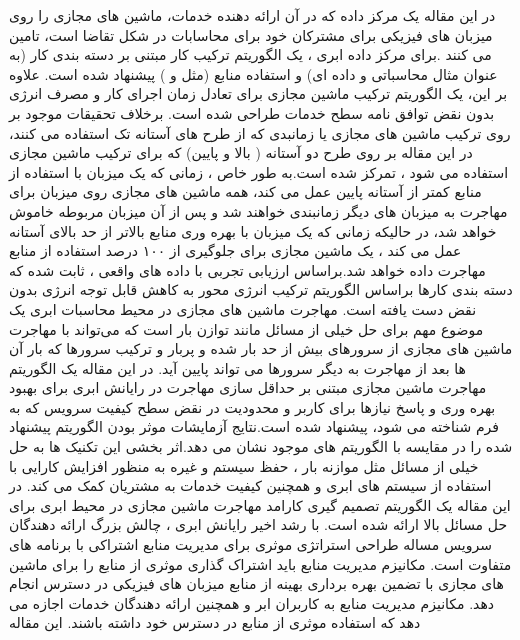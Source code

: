 در این مقاله
\cite{num8}
یک مرکز داده که در آن ارائه دهنده خدمات، ماشین های مجازی را روی میزبان های فیزیکی برای مشترکان خود برای محاسابات در شکل تقاضا است، تامین می کنند .برای مرکز داده ابری ، یک الگوریتم ترکیب کار مبتنی بر دسته بندی کار (به عنوان مثال محاسباتی و داده ای) و استفاده منابع (مثل 
  و
   ) پیشنهاد شده است. علاوه بر این، یک الگوریتم ترکیب ماشین مجازی برای تعادل زمان اجرای کار و مصرف انرژی بدون نقض توافق نامه سطح خدمات
     طراحی شده است. برخلاف تحقیقات موجود بر روی ترکیب ماشین های مجازی یا زمانبدی که از طرح های آستانه تک استفاده می کنند، در این مقاله بر روی  طرح دو آستانه ( بالا و پایین) که برای ترکیب ماشین مجازی استفاده می شود ، تمرکز شده است.به طور خاص ، زمانی که یک میزبان با استفاده از منابع کمتر از آستانه پایین عمل می کند، همه ماشین های مجازی روی میزبان برای مهاجرت به میزبان های دیگر زمانبندی خواهند شد و پس از آن میزبان مربوطه خاموش خواهد شد، در حالیکه زمانی که یک میزبان با بهره وری منابع بالاتر از حد بالای آستانه عمل می کند ، یک ماشین مجازی برای جلوگیری از  ۱۰۰ درصد استفاده از منابع مهاجرت داده خواهد شد.براساس ارزیابی تجربی با داده های واقعی ، ثابت شده که دسته بندی کارها براساس الگوریتم ترکیب انرژی محور به کاهش قابل توجه انرژی بدون نقض 
       دست یافته است.
  مهاجرت ماشین های مجازی در محیط محاسبات ابری یک موضوع مهم برای حل خیلی از مسائل مانند توازن بار است که می‌تواند با  مهاجرت ماشین های مجازی از سرورهای بیش از حد بار شده و پربار و ترکیب سرورها که بار آن ها بعد از مهاجرت به دیگر سرورها می تواند پایین آید. در این مقاله
\cite{num9}
  یک الگوریتم مهاجرت ماشین مجازی مبتنی بر حداقل سازی مهاجرت در رایانش ابری برای بهبود بهره وری و پاسخ نیازها برای کاربر و محدودیت در نقض سطح کیفیت سرویس که به فرم 
    شناخته می شود، پیشنهاد شده است.نتایج آزمایشات موثر بودن الگوریتم پیشنهاد شده 
    را در مقایسه با الگوریتم های موجود نشان می دهد.اثر بخشی این تکنیک ها به حل خیلی از مسائل مثل موازنه بار ، حفظ سیستم  و غیره به منظور افزایش کارایی با استفاده از سیستم های ابری  و همچنین کیفیت خدمات به  مشتریان کمک می کند. در این مقاله یک الگوریتم تصمیم گیری کارامد مهاجرت ماشین مجازی در محیط ابری برای حل مسائل بالا ارائه شده است. 
     با رشد اخیر رایانش ابری ، چالش بزرگ ارائه دهندگان سرویس مساله طراحی استراتژی موثری برای مدیریت منابع اشتراکی با برنامه های متفاوت است. مکانیزم مدیریت منابع باید اشتراک گذاری موثری از منابع را برای ماشین های مجازی با تضمین بهره برداری بهینه از منابع میزبان های فیزیکی در دسترس انجام دهد. مکانیزم مدیریت منابع به کاربران ابر و همچنین ارائه دهندگان خدمات اجازه می دهد که استفاده موثری از منابع در دسترس خود داشته باشند. این مقاله
